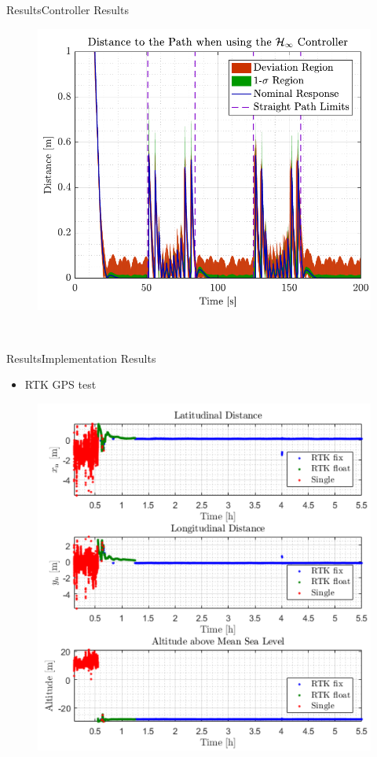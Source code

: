 \begin{frame}{Results}{Controller Results}
\begin{minipage}{0.5\linewidth}
\begin{figure}[H]
                \includegraphics[width=1\linewidth]{figures/dist_rob}
            \end{figure}             
        \end{minipage}\hfill \\    
\end{frame}

\begin{frame}{Results}{Implementation Results}
    \begin{itemize}
        \item RTK GPS test
    \end{itemize}
    \begin{figure}[H]
        \centering
        \includegraphics[width=0.5\linewidth]{figures/GPS_2DPlot}
    \end{figure}                   
\end{frame}

